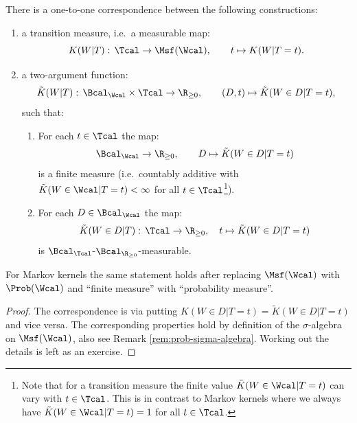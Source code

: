\begin{Lem}\label{transmeasure_is_twoargfunction}
    There is a one-to-one correspondence between the following constructions:
    \begin{enumerate}
        \item a transition measure, i.e.\ a measurable map:
            \[ K(W|T):\, \Tcal \to \Msf(\Wcal),\qquad t \mapsto K(W|T=t).  \]
        \item a two-argument function:
        \[ \tilde K(W|T):\, \Bcal_\Wcal \times \Tcal \to \R_{\ge 0}, \qquad (D,t) \mapsto \tilde K(W \in D|T=t),  \]
         such that:
    \begin{enumerate}[label=\roman*)]
        \item For each $t \in \Tcal$ the map:
            \[ \Bcal_\Wcal \to \R_{\ge 0},\qquad D \mapsto \tilde K(W\in D|T=t)\]
            is a finite measure (i.e.\ countably additive with $\tilde K(W \in \Wcal|T=t) < \infty$ for all $t \in \Tcal$\footnote{Note that for a transition measure the finite value $\tilde K(W \in \Wcal|T=t)$ can vary with $t \in \Tcal$. 
            This is in contrast to Markov kernels where we always have $\tilde K(W \in \Wcal|T=t)=1$ for all $t \in \Tcal$.}).
        \item For each $D \in \Bcal_\Wcal$ the map:
            \[ \tilde K(W \in D|T):\, \Tcal \to \R_{\ge 0},\quad t \mapsto \tilde K(W \in D|T=t) \]
            is $\Bcal_\Tcal$-$\Bcal_{\R_{\ge0}}$-measurable.
    \end{enumerate}
    \end{enumerate}
    For Markov kernels the same statement holds after replacing $\Msf(\Wcal)$ with $\Prob(\Wcal)$ and ``finite measure'' with ``probability measure''.
    \begin{proof}
        The correspondence is via putting $K(W \in D|T=t)=\tilde K(W \in D|T=t)$ and vice versa. 
        The corresponding properties hold by definition of the $\sigma$-algebra on $\Msf(\Wcal)$, 
        also see Remark \ref{rem:prob-sigma-algebra}.
        Working out the details is left as an exercise.
    \end{proof}
\end{Lem}




